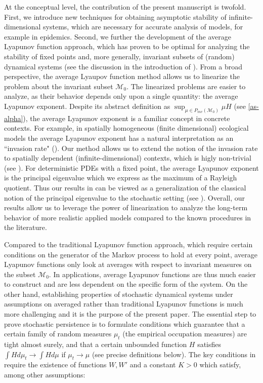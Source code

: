 \documentclass[final]{amsart}
\numberwithin{thm}{section}
\numberwithin{equation}{section}
\newcommand{\mcM}{\mathcal{M}}
\begin{document}
At the conceptual level, 
 the contribution of the present manuscript is twofold. First, we introduce new techniques for obtaining asymptotic  stability of infinite-dimensional systems, which are necessary for accurate analysis of models, for example in epidemics.
 Second, we further the development of the average Lyapunov function approach, which has proven to be optimal for analyzing the stability of fixed points and, more generally, invariant subsets of (random) dynamical systems (see the discussion in the introduction of \cite{extinction}). From a broad perspective, the average Lyaupov function method  allows us to linearize the problem about the invariant subset $\mcM_0$. The linearized problems are easier to analyze, as their behavior depends only upon a single quantity: the average Lyapunov exponent. Despite its abstract definition as $\sup_{\mu \in P_{inv}(\mcM_0)} \mu H$ (see \ref{as-alpha}), the average Lyapunov exponent is a familiar concept in concrete contexts. For example, in spatially homogeneous (finite dimensional) ecological models the average Lyapunov exponent has a natural interpretation as an ``invasion rate" (\cite{persistence, functional, ecologicalContinuous, ecologicalDiscrete, ecologicalGeneral}).  Our method allows us to extend the notion of the invasion rate to spatially dependent (infinite-dimensional) contexts, which is higly non-trivial (see ). For deterministic PDEs with a fixed point, the average Lyapunov exponent is the principal eigenvalue which we express as the maximum of a Rayleigh quotient.  Thus our results in  can be viewed as a generalization of the classical notion of the principal eigenvalue to the stochastic setting (see ). Overall, our results allow us to leverage the power of linearization to analyze the long-term behavior of more realistic applied models compared to the known procedures in the literature. 

Compared to the traditional Lyapunov function approach, which require certain conditions on the generator of the Markov process to hold at every point, average Lyapunov functions only look at averages with respect to invariant measures on the subset $\mcM_0$. In applications, average Lyapunov functions are thus much easier to construct and are less dependent on the specific form of the system. On the other hand, establishing properties of 
stochastic dynamical systems under assumptions on averaged rather than traditional Lyapunov functions is much more challenging and it is the purpose of the present paper. The essential step 
 to prove stochastic persistence is to formulate conditions which guarantee that a certain family of random measures $\mu_t$ (the empirical occupation measures) are tight almost surely, and that a certain unbounded function $H$ satisfies $\int Hd\mu_t \to \int Hd\mu$ if $\mu_t \to \mu$ (see  precise definitions below). The key conditions in  \cite{persistence, extinction} require the existence of functions $W,W'$ and a constant $K > 0$ which satisfy, among other assumptions:
\end{document}
